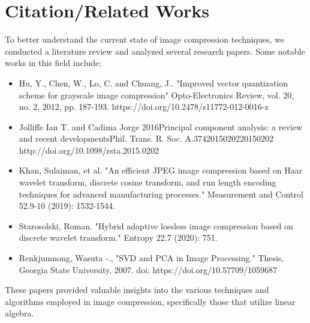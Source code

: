 \documentclass{article}
\begin{document}
\section{Citation/Related Works}
To better understand the current state of image compression techniques, we conducted a literature review and analyzed several research papers. Some notable works in this field include:
\begin{itemize}
    \item Hu, Y., Chen, W., Lo, C. and Chuang, J.. "Improved vector quantization scheme for grayscale image compression" Opto-Electronics Review, vol. 20, no. 2, 2012, pp. 187-193. https://doi.org/10.2478/s11772-012-0016-z
    \item Jolliffe Ian T. and Cadima Jorge 2016Principal component analysis: a review and recent developmentsPhil. Trans. R. Soc. A.3742015020220150202\\
    http://doi.org/10.1098/rsta.2015.0202
    \item Khan, Sulaiman, et al. "An efficient JPEG image compression based on Haar wavelet transform, discrete cosine transform, and run length encoding techniques for advanced manufacturing processes." Measurement and Control 52.9-10 (2019): 1532-1544.
    \item Starosolski, Roman. "Hybrid adaptive lossless image compression based on discrete wavelet transform." Entropy 22.7 (2020): 751.
    \item Renkjumnong, Wasuta -., "SVD and PCA in Image Processing." Thesis, Georgia State University, 2007.
    doi: https://doi.org/10.57709/1059687 
\end{itemize}
These papers provided valuable insights into the various techniques and algorithms employed in image compression, specifically those that utilize linear algebra.
\end{document}
